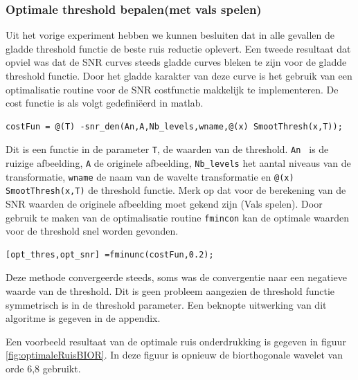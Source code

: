 \subsubsection{Optimale threshold bepalen(met vals spelen)}

Uit het vorige experiment hebben we kunnen besluiten dat in alle gevallen de gladde threshold functie de beste ruis reductie  oplevert.
Een tweede resultaat dat opviel was dat de SNR curves steeds gladde curves bleken te zijn voor de gladde threshold functie.
Door het gladde karakter van deze curve is het gebruik van een optimalisatie routine voor de SNR costfunctie makkelijk te implementeren.
De cost functie is als volgt gedefini\"eerd in matlab.
\begin{verbatim}
costFun = @(T) -snr_den(An,A,Nb_levels,wname,@(x) SmootThresh(x,T));
\end{verbatim}
Dit is een functie in de parameter \verb|T|, de waarden van de threshold.
\verb|An | is de ruizige afbeelding, \verb|A| de originele afbeelding, \verb|Nb_levels| het aantal niveaus van de transformatie, \verb|wname| de naam van de wavelte transformatie en \verb|@(x) SmootThresh(x,T)| de threshold functie.
Merk op dat voor de berekening van de SNR waarden de originele afbeelding moet gekend zijn (Vals spelen).
Door gebruik te maken van de optimalisatie routine \verb|fmincon| kan de optimale waarden voor de threshold snel worden gevonden.
\begin{verbatim}
[opt_thres,opt_snr] =fminunc(costFun,0.2);
\end{verbatim}
Deze methode convergeerde steeds, soms was de convergentie naar een negatieve waarde van de threshold.
Dit is geen probleem aangezien de threshold functie symmetrisch is in de threshold parameter.
Een beknopte uitwerking van dit algoritme is gegeven in de appendix.

Een voorbeeld resultaat van de optimale ruis onderdrukking is gegeven in figuur \ref{fig:optimaleRuisBIOR}.
In deze figuur is opnieuw de biorthogonale wavelet van orde 6,8 gebruikt.


